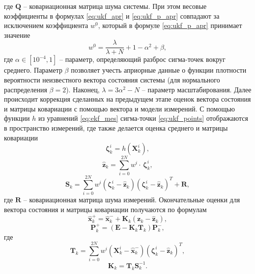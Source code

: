 где $\bm{Q}$ -- ковариационная матрица шума системы.
При этом весовые коэффициенты в формулах \eqref{eq:ukf_apr} и \eqref{eq:ukf_p_apr} совпадают за исключением коэффициента  ${w^0}$, который в формуле \eqref{eq:ukf_p_apr} принимает значение \cite{Kulikova01}
\begin{equation}
w^0 = \frac{{{\lambda }}}{{{{\lambda }} + N}} + 1 - {{{\alpha }}^2} + {{\beta }},
\end{equation}
где
${{\alpha }} \in \left[ {{{10}^{ - 4}},1} \right]$
-- параметр, определяющий разброс сигма-точек вокруг среднего.
Параметр ${{\beta }}$  позволяет учесть априорные данные о функции плотности вероятности неизвестного вектора состояния системы (для нормального распределения  ${{\beta }} = 2$). Наконец, ${{\lambda }} = 3{{{\alpha }}^2} - N$ -- параметр масштабирования.
Далее происходит коррекция сделанных на предыдущем этапе оценок вектора состояния и матрицы ковариации с помощью вектора и модели измерений.
С помощью функции $h$ из уравнений \eqref{eq:ekf_mes} сигма-точки \eqref{eq:ukf_points} отображаются в пространство измерений, где также делается оценка среднего и матрицы ковариации
\begin{equation}
{\bm{\zeta }}_k^i = h\left( {{\bm{X}}_k^i} \right),
\end{equation}
\begin{equation}
{{{\bm{\hat z}}}_k} = \sum\limits_{i = 0}^{2N} {{w^i} \cdot } \,{\bm{\zeta }}_k^i,
\end{equation}
\begin{equation} \label{eq:ukf_s_k}
{{\bm{S}}_k} = \sum\limits_{i = 0}^{2N} {{w^i}\left( {{\bm{\zeta }}_k^i - {{{\bm{\hat z}}}_k}} \right)} {\left( {{\bm{\zeta }}_k^i - {{{\bm{\hat z}}}_k}} \right)^{{T}}} + {\bm{R}},
\end{equation}
где $\bm R$ -- ковариационная матрица шума измерений. Окончательные оценки для вектора состояния и матрицы ковариации получаются по формулам
\begin{equation}
{\bm{\hat x}}_k^ +  = {\bm{\hat x}}_k^ -  + {{\bm{K}}_k}({{\bm{z}}_k} - {{{\bm{\hat z}}}_k}),
\end{equation}
\begin{equation}
{\bm{P}}_k^ +  = \left( {{\bm{E}} - {{\bm{K}}_k}{{\bm{T}}_k}} \right){\bm{P}}_k^ - ,
\end{equation}
где
\begin{equation}
{{\bm{T}}_k} = \sum\limits_{i = 0}^{2N} {{w^i}\left( {{\bm{X}}_k^i - {\bm{\hat x}}_k^ - } \right)} {\left( {{\bm{\zeta }}_k^i - {{{\bm{\hat z}}}_k}} \right)^{{T}}},
\end{equation}
\begin{equation}
{{\bm{K}}_k} = {{\bm{T}}_k}{\bm{S}}_k^{ - 1}.
\end{equation}

